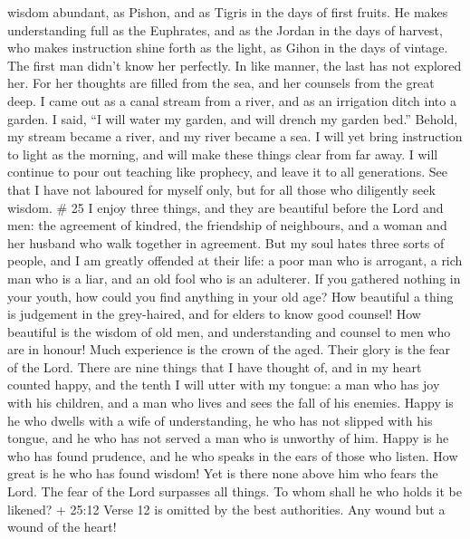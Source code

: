 wisdom abundant, as Pishon, and as Tigris in the days of first fruits.
 He makes understanding full as the Euphrates, and as the
Jordan in the days of harvest,  who makes instruction shine
forth as the light, as Gihon in the days of vintage.  The
first man didn't know her perfectly. In like manner, the last has not
explored her.  For her thoughts are filled from the sea,
and her counsels from the great deep.  I came out as a
canal stream from a river, and as an irrigation ditch into a garden.
 I said, ``I will water my garden, and will drench my
garden bed.'' Behold, my stream became a river, and my river became a
sea.  I will yet bring instruction to light as the morning,
and will make these things clear from far away.  I will
continue to pour out teaching like prophecy, and leave it to all
generations.  See that I have not laboured for myself only,
but for all those who diligently seek wisdom. \# 25  I enjoy
three things, and they are beautiful before the Lord and men: the
agreement of kindred, the friendship of neighbours, and a woman and her
husband who walk together in agreement.  But my soul hates
three sorts of people, and I am greatly offended at their life: a poor
man who is arrogant, a rich man who is a liar, and an old fool who is an
adulterer.  If you gathered nothing in your youth, how could
you find anything in your old age?  How beautiful a thing is
judgement in the grey-haired, and for elders to know good counsel!
 How beautiful is the wisdom of old men, and understanding
and counsel to men who are in honour!  Much experience is
the crown of the aged. Their glory is the fear of the Lord. 
There are nine things that I have thought of, and in my heart counted
happy, and the tenth I will utter with my tongue: a man who has joy with
his children, and a man who lives and sees the fall of his enemies.
 Happy is he who dwells with a wife of understanding, he who
has not slipped with his tongue, and he who has not served a man who is
unworthy of him.  Happy is he who has found prudence, and he
who speaks in the ears of those who listen.  How great is
he who has found wisdom! Yet is there none above him who fears the Lord.
 The fear of the Lord surpasses all things. To whom shall
he who holds it be likened?  + 25:12 Verse 12 is omitted by
the best authorities.  Any wound but a wound of the heart!
